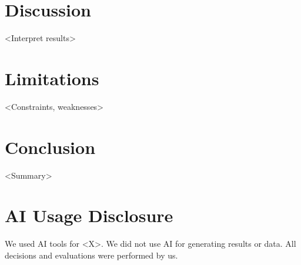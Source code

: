 \documentclass[11pt]{article}
\begin{document}
\section{Discussion}

<Interpret results>

\section{Limitations}

<Constraints, weaknesses>

\section{Conclusion}

<Summary>

\section*{AI Usage Disclosure}

We used AI tools for <X>. We did not use AI for generating results or data.
All decisions and evaluations were performed by us.


\end{document}
